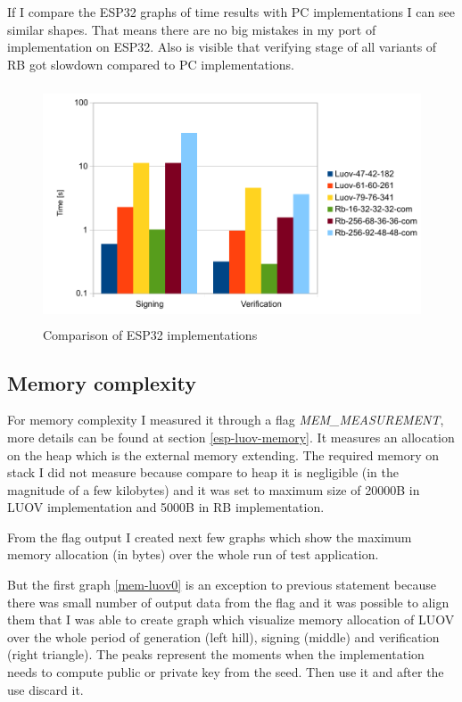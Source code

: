 \documentclass[thesis=M,english]{FITthesis}[2019/12/23]
\begin{document}
\bigskip
\noindent
If I compare the ESP32 graphs of time results with PC implementations I can see similar shapes. That means there are no big mistakes in my port of implementation on ESP32. Also is visible that verifying stage of all variants of RB got slowdown compared to PC implementations.

\begin{figure}[H]
\centering
\includegraphics[width=13cm,height=7cm]{images/time-both.pdf}
\caption{Comparison of ESP32 implementations}
\label{time-both}
\end{figure}

\subsection{Memory complexity}
For memory complexity I measured it through a flag \textit{MEM\_MEASUREMENT}, more details can be found at section \ref{esp-luov-memory}. It measures an allocation on the heap which is the external memory extending. The required memory on stack I did not measure because compare to heap it is negligible (in the magnitude of a few kilobytes) and it was set to maximum size of 20000B in LUOV implementation and 5000B in RB implementation.

\bigskip
\noindent
From the flag output I created next few graphs which show the maximum memory allocation (in bytes) over the whole run of test application.

\bigskip
\noindent
But the first graph \ref{mem-luov0} is an exception to previous statement because there was small number of output data from the flag and it was possible to align them that I was able to create graph which visualize memory allocation of LUOV over the whole period of generation (left hill), signing (middle) and verification (right triangle). The peaks represent the moments when the implementation needs to compute public or private key from the seed. Then use it and after the use discard it.
\end{document}
